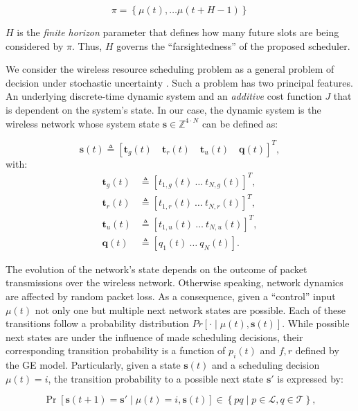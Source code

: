 \begin{equation}
  \pi=\left\{\mu(t),\dots\mu(t+H-1) \right\}
\end{equation}

$H$ is the \textit{finite horizon} parameter that defines how many future slots
are being considered by $\pi$. Thus, $H$ governs the ``farsightedness'' of the
proposed scheduler.

We consider the wireless resource scheduling problem as a general problem of
decision under stochastic uncertainty \cite{bertsekas1995dynamic}. Such a
problem has two principal features. An underlying discrete-time dynamic system
and an \textit{additive} cost function $J$ that is dependent on the system's
state. In our case, the dynamic system is the wireless network whose system
state $\boldsymbol{s} \in \mathbb{Z}^{4\cdot N}$ can be defined as:

\begin{equation}
  \boldsymbol{s}(t) \triangleq \left[\boldsymbol{t}_g(t) \quad \boldsymbol{t}_r(t) \quad \boldsymbol{t}_u(t) \quad \boldsymbol{q}(t)\right]^T, 
\end{equation}   
with: 
\begin{align}
  \boldsymbol{t}_g(t) &\triangleq \left[ t_{1,g}(t) ~ \dots ~ t_{N,g}(t) \right]^T ,\\
  \boldsymbol{t}_r(t) &\triangleq \left[ t_{1,r}(t) ~ \dots ~ t_{N,r}(t) \right]^T ,\\
  \boldsymbol{t}_u(t) &\triangleq \left[ t_{1,u}(t) ~ \dots ~ t_{N,u}(t) \right]^T ,\\
  \boldsymbol{q}(t) &\triangleq \left[ q_1(t) ~ \dots ~ q_N(t) \right].
\end{align}  

The evolution of the network's state depends on the outcome of packet
transmissions over the wireless network. Otherwise speaking, network dynamics
are affected by random packet loss. As a consequence, given a ``control'' input
$\mu(t)$ not only one but multiple next network states are possible. Each of
these transitions follow a probability distribution $Pr\left[\cdot\mid\mu(t),
\boldsymbol{s}(t) \right]$. While possible next states are under the influence
of made scheduling decisions, their corresponding transition probability is a
function of $p_i(t)$ and $f,r$ defined by the GE model. Particularly, given a
state $\boldsymbol{s}(t)$ and a scheduling decision $\mu(t)=i$, the transition
probability to a possible next state $\boldsymbol{s'}$ is expressed by:

\begin{equation}
  \label{eq:transition}
  \Pr \left[ \boldsymbol{s}(t+1)=\boldsymbol{s}' \mid \mu(t)=i,\boldsymbol{s}(t)
  \right] \in \left\{ pq \mid p\in\mathcal{L},q\in\mathcal{T} \right\},
\end{equation}

